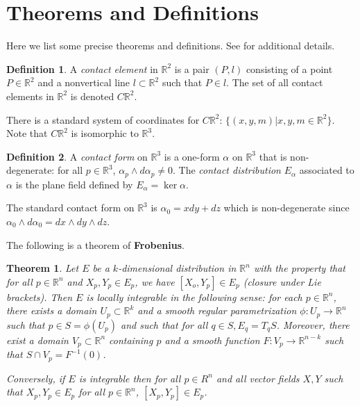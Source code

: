 \documentclass{article}
\newtheorem{theorem}{Theorem}[section]
\theoremstyle{definition}
\newtheorem{definition}{Definition}[section]
\begin{document}
\section {Theorems and Definitions}

Here we list some precise theorems and definitions. See \cite{mcinerney} for additional details.

\theoremstyle{definition}
\begin{definition} A \textit{contact element} in $\mathbb{R}^{2}$ is a pair $(P,
  l)$ consisting of a point $P \in \mathbb{R}^{2}$ and a nonvertical line $l
  \subset \mathbb{R}^{2}$ such that $P \in l$. The set of all contact elements
  in $\mathbb{R}^{2}$ is denoted $C\mathbb{R}^{2}$.
\end{definition}

There is a standard system of coordinates for $C\mathbb{R}^{2}$: $\{(x, y, m) |
  x, y, m \in \mathbb{R}^{2}\}$. Note that $C\mathbb{R}^{2}$ is isomorphic to $\mathbb{R}^{3}$.

\begin{definition} A \textit{contact form} on $\mathbb{R}^{3}$ is a one-form
  $\alpha$ on $\mathbb{R}^{3}$ that is non-degenerate: for all $p \in
  \mathbb{R}^{3}$, $\alpha_{p} \wedge d\alpha_{p} \neq 0$. The \textit{contact
    distribution} $E_{\alpha}$ associated to $\alpha$ is the plane field defined
  by $E_{\alpha} = \ker \alpha$.
\end{definition}

The standard contact form on $\mathbb{R}^{3}$ is $\alpha_{0} = xdy + dz$ which is
non-degenerate since $\alpha_{0} \wedge d\alpha_{0} = dx \wedge dy \wedge dz$.

The following is a theorem of \textbf{Frobenius}.

\begin{theorem} 
Let $E$ be a $k$-dimensional distribution in $\mathbb{R}^{n}$ with the property
that for all $p \in \mathbb{R}^{n}$ and $X_{p}, Y_{p} \in E_{p}$, we have
$[X_{o}, Y_{p}] \in E_{p}$ (closure under Lie brackets). Then $E$ is locally
integrable in the following sense: for each $p \in \mathbb{R}^{n}$, there exists
a domain $U_{p} \subset \mathbb{R}^{k}$ and a smooth regular parametrization
$\phi : U_{p} \to \mathbb{R}^{n}$ such that $p \in S = \phi(U_{p})$ and such
that for all $q \in S, E_{q} = T_{q}S$. Moreover, there exist a domain $V_{p}
\subset \mathbb{R}^{n}$ containing $p$ and a smooth function $F : V_{p} \to
\mathbb{R}^{n - k}$ such that $S \cap V_{p} = F^{-1}(0)$.

Conversely, if $E$ is integrable then for all $p \in R^{n}$ and all vector
fields $X, Y$ such that $X_{p}, Y_{p} \in E_{p}$ for all $p \in \mathbb{R}^{n}$,
$[X_{p}, Y_{p}] \in E_{p}$.
\end{theorem}
\end{document}
